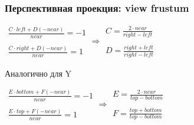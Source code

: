 \documentclass[10pt]{beamer}
\begin{document}
\begin{frame}[fragile]
\frametitle{Перспективная проекция: view frustum}
\begin{center}
\begin{math}
\begin{matrix}
\frac{C\cdot left + D(-near)}{near} = -1 \\ \\
\frac{C\cdot right + D(-near)}{near} = 1
\end{matrix}
\Longrightarrow
\begin{matrix}
C = \frac{2\cdot near}{right - left} \\ \\
D = \frac{right + left}{right - left}
\end{matrix}
\end{math}
\end{center}
\pause
Аналогично для Y
\begin{center}
\begin{math}
\begin{matrix}
\frac{E\cdot bottom + F(-near)}{near} = -1 \\ \\
\frac{E\cdot top + F(-near)}{near} = 1
\end{matrix}
\Longrightarrow
\begin{matrix}
E = \frac{2\cdot near}{top - bottom} \\ \\
F = \frac{top + bottom}{top - bottom}
\end{matrix}
\end{math}
\end{center}
\end{frame}
\end{document}

